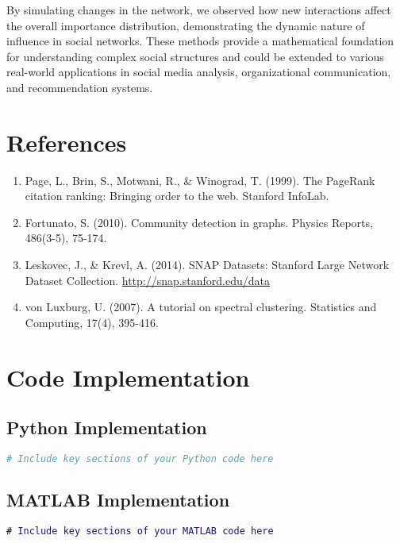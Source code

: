 \documentclass[12pt,letterpaper]{article}
\begin{document}
By simulating changes in the network, we observed how new interactions affect the overall importance distribution, demonstrating the dynamic nature of influence in social networks. These methods provide a mathematical foundation for understanding complex social structures and could be extended to various real-world applications in social media analysis, organizational communication, and recommendation systems.

\section{References}
\begin{enumerate}
    \item Page, L., Brin, S., Motwani, R., \& Winograd, T. (1999). The PageRank citation ranking: Bringing order to the web. Stanford InfoLab.
    \item Fortunato, S. (2010). Community detection in graphs. Physics Reports, 486(3-5), 75-174.
    \item Leskovec, J., \& Krevl, A. (2014). SNAP Datasets: Stanford Large Network Dataset Collection. \url{http://snap.stanford.edu/data}
    \item von Luxburg, U. (2007). A tutorial on spectral clustering. Statistics and Computing, 17(4), 395-416.
\end{enumerate}

\appendix
\section{Code Implementation}
\subsection{Python Implementation}
\begin{lstlisting}[language=Python, caption=PageRank and Community Detection in Python]
# Include key sections of your Python code here
\end{lstlisting}

\subsection{MATLAB Implementation}
\begin{lstlisting}[language=Matlab, caption=PageRank and Community Detection in MATLAB]
# Include key sections of your MATLAB code here
\end{lstlisting}
\end{document}
